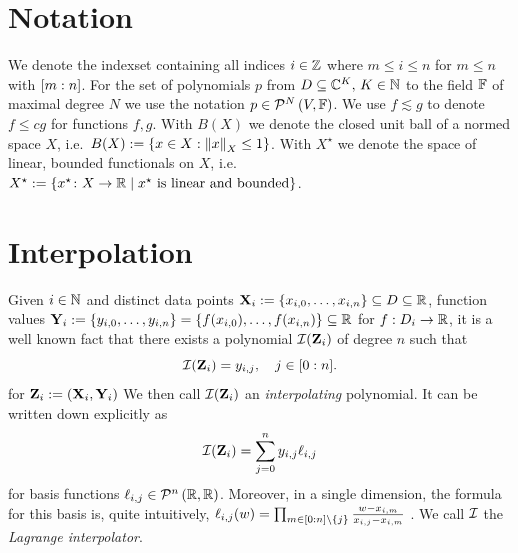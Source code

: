 \documentclass[12pt, oneside]{amsart}
\theoremstyle{definition}
\theoremstyle{remark}
\numberwithin{equation}{section}
\begin{document}
\section{Notation}

We denote the indexset containing all indices $i\in \Z$ 
where $m\leq i\leq n$ for $m\leq n$ with \(\indexset[m]{n}\). For the set of 
polynomials \(p\) from \(D \subseteq \C^K,\, K \in \N\) to the field \(\F\) of maximal 
degree \(N\) we use the notation 
\(p \in \pols[N]{V, \F}\).
We use \(f \lesssim g\) to denote \(f \leq c 
g\) for functions \(f, g\). With \(B(X)\) we denote the closed unit ball of a normed space \(X\), 
i.e.\ \(B(X) \defn \set{x \in X: \norm[X]{x} \leq 1}\). With \(X^\star\) we 
denote the space of linear, bounded functionals on \(X\), i.e. \(X^\star \defn 
\set{x^\star\from X \to \R \mid x^\star \text{ is linear and bounded}}\).
\newpage
\section{Interpolation}

Given \(i \in \N\) and distinct data points \(\XX_i \defn \set{x_{i, 0}, \dots, x_{i, n}} \subseteq D \subseteq \R\), function values \(\YY_i \defn \set{y_{i, 0}, \dots, y_{i, n}} = \set{f(x_{i, 0}), \dots, f(x_{i, n})} \subseteq \R\) for \(f: D_i \to \R\), it is a well known fact that there exists a polynomial \(\cI(\ZZ_i)\) of degree \(n\) such that \[
    \cI(\ZZ_i) = y_{i, j},\quad j \in \indexset[0]{n}.
\]
for \(\ZZ_i \defn (\XX_i, \YY_i)\)
We then call \(\cI(\ZZ_i)\) an \emph{interpolating} polynomial. It can be written down explicitly as \begin{equation}\label{interpolating_polynomial}
    \cI(\ZZ_i) = \sum_{j=0}^n y_{i, j} \ell_{i, j}
\end{equation}
for basis functions \(\ell_{i, j} \in \pols[n]{\R, \R}\). Moreover, in a single dimension, the formula for this basis is, quite intuitively, \(\ell_{i, j}(w) = \prod_{m \in \indexset[0]{n} \setminus \set{j}} \frac{w-x_{i, m}}{x_{i, j}-x_{i, m}}\) \cite{waring1779, lagrange1901}. We call \(\cI\) the \emph{Lagrange interpolator}.
\end{document}

